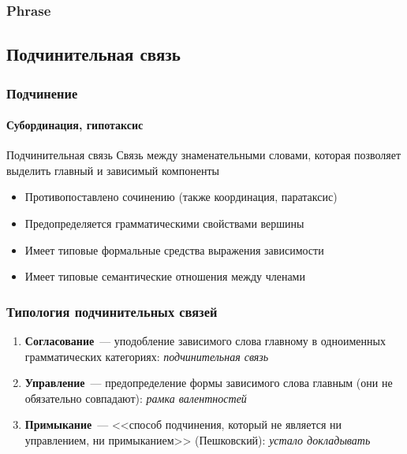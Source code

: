 \begin{frame}
  \frametitle{Phrase}
\end{frame}

\subsection{Подчинительная связь}

\begin{frame}
  \frametitle{Подчинение}
  \framesubtitle{Субординация, гипотаксис}

  \begin{alertblock}{Подчинительная связь}
    Связь между знаменательными словами, которая позволяет выделить главный и зависимый компоненты
  \end{alertblock}

  \vfill

  \begin{itemize}
    \item Противопоставлено сочинению (также координация, паратаксис)
    \item Предопределяется грамматическими свойствами вершины
    \item Имеет типовые формальные средства выражения зависимости
    \item Имеет типовые семантические отношения между членами
  \end{itemize}
\end{frame}

\begin{frame}
  \frametitle{Типология подчинительных связей}

  \begin{enumerate}
    \item \textbf{Согласование}~--- уподобление зависимого слова главному в одноименных грамматических категориях: \textit{подчинительная связь}
    \item \textbf{Управление}~--- предопределение формы зависимого слова главным (они не обязательно совпадают): \textit{рамка валентностей}
    \item \textbf{Примыкание}~--- <<способ подчинения, который не является ни управлением, ни примыканием>> (Пешковский): \textit{устало докладывать}
  \end{enumerate}
\end{frame}

